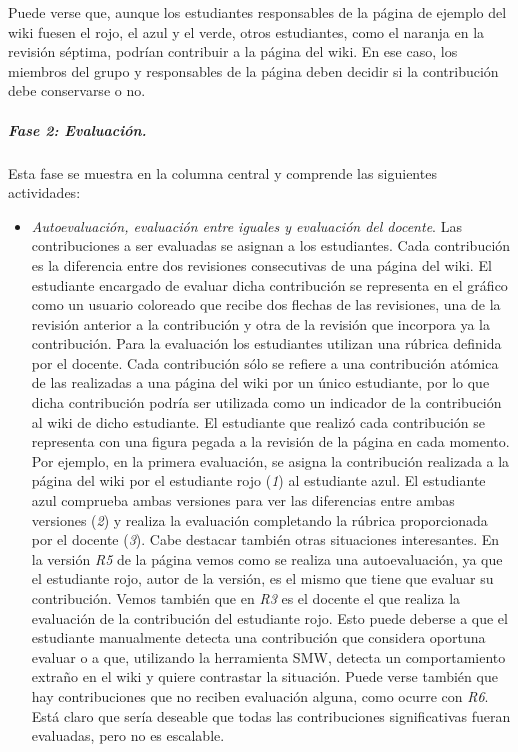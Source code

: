 			Puede verse que, aunque los estudiantes responsables de la página de ejemplo del wiki fuesen el rojo, el azul y el verde, otros estudiantes, como el naranja en la revisión séptima, podrían contribuir a la página del wiki. En ese caso, los miembros del grupo y responsables de la página deben decidir si la contribución debe conservarse o no.

			\subparagraph*{Fase 2: Evaluación.}

			Esta fase se muestra en la columna central y comprende las siguientes actividades:

			\begin{itemize}
				\item \emph{Autoevaluación, evaluación entre iguales y evaluación del docente}. Las contribuciones a ser evaluadas se asignan a los estudiantes.  Cada contribución es la diferencia entre dos revisiones consecutivas de una página del wiki. El estudiante encargado de evaluar dicha contribución se representa en el gráfico como un usuario coloreado que recibe dos flechas de las revisiones, una de la revisión anterior a la contribución y otra de la revisión que incorpora ya la contribución. Para la evaluación los estudiantes utilizan una rúbrica definida por el docente. Cada contribución sólo se refiere a una contribución atómica de las realizadas a una página del wiki por un único estudiante, por lo que dicha contribución podría ser utilizada como un indicador de la contribución al wiki de dicho estudiante. El estudiante que realizó cada contribución se representa con una figura pegada a la revisión de la página en cada momento.
Por ejemplo, en la primera evaluación, se asigna la contribución realizada a la página del wiki por el estudiante rojo (\emph{1}) al estudiante azul. El estudiante azul comprueba ambas versiones para ver las diferencias entre ambas versiones (\emph{2}) y realiza la evaluación completando la rúbrica proporcionada por el docente (\emph{3}).
Cabe destacar también otras situaciones interesantes. En la versión \emph{R5} de la página vemos como se realiza una autoevaluación, ya que el estudiante rojo, autor de la versión, es el mismo que tiene que evaluar su contribución. Vemos también que en \emph{R3} es el docente el que realiza la evaluación de la contribución del estudiante rojo. Esto puede deberse a que el estudiante manualmente detecta una contribución que considera oportuna evaluar o a que, utilizando la herramienta SMW, detecta un comportamiento extraño en el wiki y quiere contrastar la situación. 
Puede verse también que hay contribuciones que no reciben evaluación alguna, como ocurre con \emph{R6}. Está claro que sería deseable que todas las contribuciones significativas fueran evaluadas, pero no es escalable.

\end{itemize}
